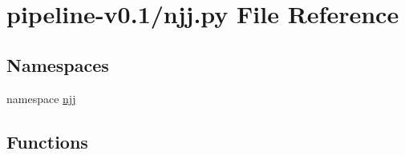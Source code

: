 \hypertarget{pipeline-v0_81_2njj_8py}{\section{pipeline-\/v0.1/njj.py \-File \-Reference}
\label{pipeline-v0_81_2njj_8py}
}
\subsection*{\-Namespaces}
\begin{DoxyCompactItemize}
\item 
namespace \hyperlink{namespacenjj}{njj}
\end{DoxyCompactItemize}
\subsection*{\-Functions}
